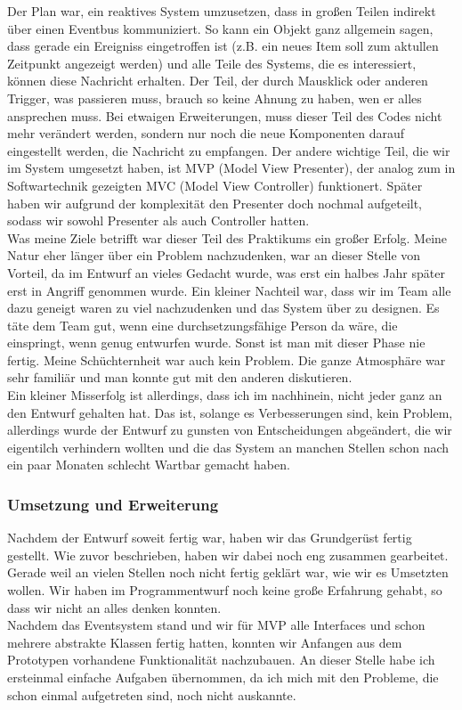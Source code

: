 Der Plan war, ein reaktives System umzusetzen, dass in großen Teilen indirekt über einen Eventbus kommuniziert. So kann ein Objekt ganz allgemein sagen, dass gerade ein Ereigniss eingetroffen ist (z.B. ein neues Item soll zum aktullen Zeitpunkt angezeigt werden) und alle Teile des Systems, die es interessiert, können diese Nachricht erhalten. Der Teil, der durch Mausklick oder anderen Trigger, was passieren muss, brauch so keine Ahnung zu haben, wen er alles ansprechen muss. Bei etwaigen Erweiterungen, muss dieser Teil des Codes nicht mehr verändert werden, sondern nur noch die neue Komponenten darauf eingestellt werden, die Nachricht zu empfangen. Der andere wichtige Teil, die wir im System umgesetzt haben, ist MVP (Model View Presenter), der analog zum in Softwartechnik gezeigten MVC (Model View Controller) funktionert. Später haben wir aufgrund der komplexität den Presenter doch nochmal aufgeteilt, sodass wir sowohl Presenter als auch Controller hatten.\\

Was meine Ziele betrifft war dieser Teil des Praktikums ein großer Erfolg. Meine Natur eher länger über ein Problem nachzudenken, war an dieser Stelle von Vorteil, da im Entwurf an vieles Gedacht wurde, was erst ein halbes Jahr später erst in Angriff genommen wurde. Ein kleiner Nachteil war, dass wir im Team alle dazu geneigt waren zu viel nachzudenken und das System über zu designen. Es täte dem Team gut, wenn eine durchsetzungsfähige Person da wäre, die einspringt, wenn genug entwurfen wurde. Sonst ist man mit dieser Phase nie fertig. Meine Schüchternheit war auch kein Problem. Die ganze Atmosphäre war sehr familiär und man konnte gut mit den anderen diskutieren.\\

Ein kleiner Misserfolg ist allerdings, dass ich im nachhinein, nicht jeder ganz an den Entwurf gehalten hat. Das ist, solange es Verbesserungen sind, kein Problem, allerdings wurde der Entwurf zu gunsten von Entscheidungen abgeändert, die wir eigentilch verhindern wollten und die das System an manchen Stellen schon nach ein paar Monaten schlecht Wartbar gemacht haben.

\subsubsection{Umsetzung und Erweiterung}

Nachdem der Entwurf soweit fertig war, haben wir das Grundgerüst fertig gestellt. Wie zuvor beschrieben, haben wir dabei noch eng zusammen gearbeitet. Gerade weil an vielen Stellen noch nicht fertig geklärt war, wie wir es Umsetzten wollen. Wir haben im Programmentwurf noch keine große Erfahrung gehabt, so dass wir nicht an alles denken konnten.\\
Nachdem das Eventsystem stand und wir für MVP alle Interfaces und schon mehrere abstrakte Klassen fertig hatten, konnten wir Anfangen aus dem Prototypen vorhandene Funktionalität nachzubauen. An dieser Stelle habe ich ersteinmal einfache Aufgaben übernommen, da ich mich mit den Probleme, die schon einmal aufgetreten sind, noch nicht auskannte.

